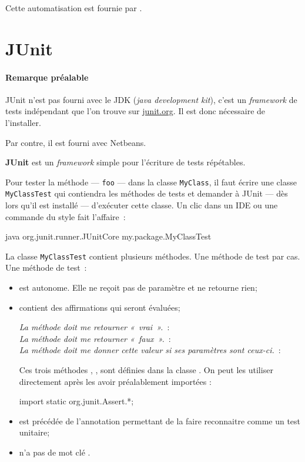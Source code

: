 Cette automatisation est fournie par .

\section{JUnit}

\paragraph{Remarque préalable} JUnit n'est pas fourni avec le JDK (\textit{java
development kit}), c'est un \textit{framework} de tests indépendant que l'on
trouve sur \url{junit.org}. Il est donc nécessaire de l'installer. 

Par contre, il est fourni avec Netbeans. 

\textbf{JUnit} est un \textit{framework} simple pour l'écriture de tests
répétables. 

Pour tester la méthode — \texttt{foo} — dans la classe \texttt{MyClass}, il faut
écrire une classe \texttt{MyClassTest} qui contiendra les méthodes de tests et
demander à JUnit — dès lors qu'il est installé — d'exécuter cette classe. Un clic dans un IDE ou une commande du style fait l'affaire~:

\begin{term}
	java org.junit.runner.JUnitCore my.package.MyClassTest
\end{term}

La classe \texttt{MyClassTest} contient plusieurs méthodes. Une méthode de test
par cas. Une méthode de test~: 

\begin{itemize}
	\item est autonome. Elle ne reçoit pas de paramètre et ne retourne rien;
	
	\item contient des affirmations qui seront évaluées;

		\textit{La méthode doit me retourner «~vrai~».}~: \\
		\textit{La méthode doit me retourner «~faux~».}~: \\
		\textit{La méthode doit me donner cette valeur si ses paramètres sont
		ceux-ci.}~:\\

              Ces trois méthodes , ,  sont définies dans la classe .
              On peut les utiliser directement après les avoir préalablement importées :
\begin{java}
import static org.junit.Assert.*;
\end{java}
              

	\item est précédée de l'annotation  permettant de la faire
		reconnaitre comme un test unitaire;

	\item n'a pas de mot clé .

\end{itemize}

